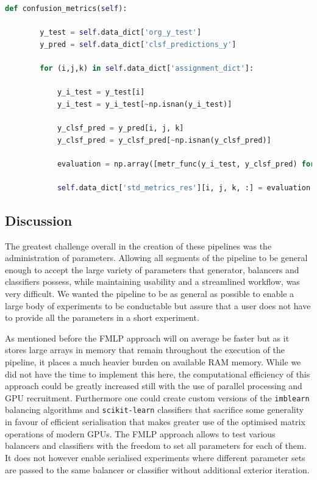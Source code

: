 \begin{lstlisting}[language=Python, numbers=none]
def confusion_metrics(self):
	
        y_test = self.data_dict['org_y_test']
        y_pred = self.data_dict['clsf_predictions_y']

        for (i,j,k) in self.data_dict['assignment_dict']:
            
            y_i_test = y_test[i]
            y_i_test = y_i_test[~np.isnan(y_i_test)]

            y_clsf_pred = y_pred[i, j, k]
            y_clsf_pred = y_clsf_pred[~np.isnan(y_clsf_pred)]

            evaluation = np.array([metr_func(y_i_test, y_clsf_pred) for (name, metr_func) in self.std_metric_list])

            self.data_dict['std_metrics_res'][i, j, k, :] = evaluation
\end{lstlisting}


\subsection{Discussion}

The greatest challenge overall in the creation of these pipelines was the administration of parameters. 
Allowing all segments of the pipeline to be general enough to accept the large variety of parameters that generator, balancers and classifiers possess,
while maintaining usability and a streamlined workflow, was very difficult.
We wanted the pipeline to be as general as possible to enable a large body of experiments to be conductable but assure that a user does not have to provide
all the parameters in a short experiment.

As mentioned before the FMLP approach will on average be faster but as it stores large arrays in memory that remain throughout the execution of the pipeline,
it places a much heavier burden on available RAM memory. 
While we did not have the time to implement this here, the computational efficiency of this approach could be greatly increased still 
with the use of parallel processing and GPU recruitment. 
Furthermore one could create custom versions of the \texttt{imblearn} balancing algorithms and \texttt{scikit-learn} classifiers that sacrifice some generality
in favour of efficient serialisation that makes greater use of the optimised matrix operations of modern GPUs.
The FMLP approach allows to test various balancers and classifiers with the freedom to set all parameters for each of them.
It does not however enable serialised experiments where different parameter sets are passed to the same balancer or classifier without additional exterior iteration.







